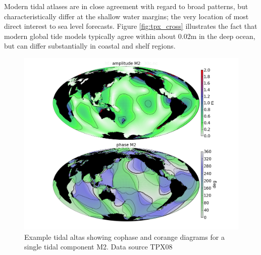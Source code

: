 Modern tidal atlases are in close agreement with regard to broad patterns, but characteristically differ at the shallow water margins; the very location of most direct interest to sea level forecasts.  Figure \ref{fig:tpx_cross} illustrates the fact that modern global tide models typically agree within about 0.02m in the deep ocean, but can differ substantially in coastal and shelf regions.  
\begin{figure}[h]
    \begin{center}
    \includegraphics[width=\figwidthBig]{figures/maps/global_m2_tpx08.png}
    \caption{Example tidal altas showing cophase and corange diagrams for a single tidal component M2.  Data source TPX08 \cite{Egbert:2002ug}  }
    \end{center}
    \label{fig:atlas}
\end{figure}
